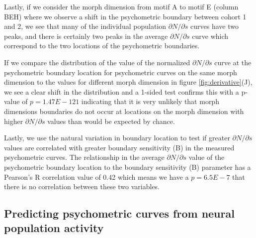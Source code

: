 Lastly, if we consider the morph dimension from motif A to motif E (column BEH) where we observe a shift in the psychometric boundary between cohort 1 and 2, we see that many of the individual population $\partial N / \partial s$ curves have two peaks, and there is certainly two peaks in the average $\partial N / \partial s$ curve which correspond to the two locations of the psychometric boundaries.

If we compare the distribution of the value of the normalized $\partial N / \partial s$ curve at the psychometric boundary location for psychometric curves on the same morph dimension to the values for different morph dimension in figure \ref{fig:derivative}(J), we see a clear shift in the distribution and a 1-sided \KS test confirms this with a p-value of $p=1.47E-121$ indicating that it is very unlikely that morph dimensions boundaries do not occur at locations on the morph dimension with higher $\partial N / \partial s$ values than would be expected by chance.

Lastly, we use the natural variation in boundary location to test if greater $\partial N / \partial s$ values are correlated with greater boundary sensitivity (B) in the measured psychometric curves. The relationship in the average $\partial N / \partial s$ value of the psychometric boundary location to the boundary sensitivity (B) parameter has a Pearson's R correlation value of 0.42 which means we have a $p=6.5E-7$ that there is no correlation between these two variables.

\subsection{Predicting psychometric curves from neural population activity}
